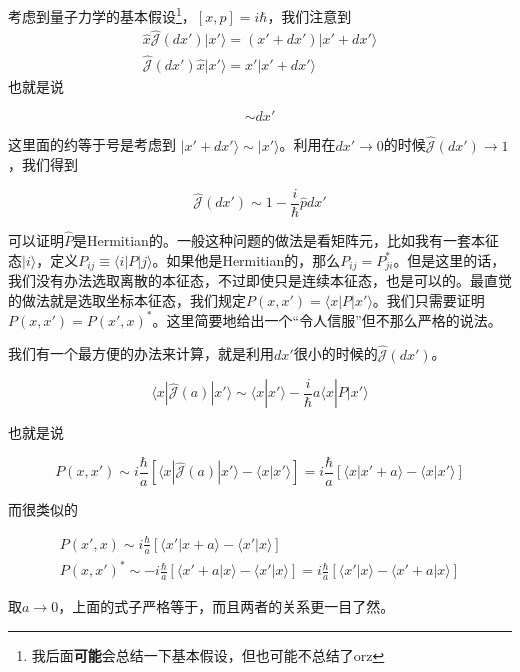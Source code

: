 考虑到量子力学的基本假设\footnote{我后面{\bf 可能}会总结一下基本假设，但也可能不总结了orz}，$[x,p] = i\hbar$，我们注意到
\begin{gather}
\hat{x}\hat{\mathcal{J}}(dx')|x'\rangle = (x'+dx')|x'+dx'\rangle\\
\hat{\mathcal{J}}(dx')\hat{x}|x'\rangle = x'|x'+dx'\rangle
\end{gather}
也就是说

\begin{equation}
[\hat{x},\hat{\mathcal{J}}(dx')] \sim dx'
\end{equation}

这里面的约等于号是考虑到 $|x'+dx'\rangle \sim |x'\rangle$。利用在$dx'\rightarrow0$的时候$\hat{\mathcal{J}}(dx')\rightarrow1$，我们得到

\begin{equation}
\hat{\mathcal{J}}(dx') \sim 1-\frac{i}{\hbar}\hat{p}dx'
\end{equation}

\begin{exam}{}
可以证明$\hat{P}$是Hermitian的。一般这种问题的做法是看矩阵元，比如我有一套本征态$|i\rangle$，定义$P_{ij} \equiv \langle i|P|j\rangle$。如果他是Hermitian的，那么$P_{ij} = P_{ji}^*$。但是这里的话，我们没有办法选取离散的本征态，不过即使只是连续本征态，也是可以的。最直觉的做法就是选取坐标本征态，我们规定$P(x,x') = \langle x|P|x'\rangle$。我们只需要证明$P(x,x') = P(x',x)^*$。这里简要地给出一个“令人信服”但不那么严格的说法。

我们有一个最方便的办法来计算，就是利用$dx'$很小的时候的$\hat{\mathcal{J}}(dx')$。

\begin{equation}
\langle x|\hat{\mathcal{J}}(a)|x'\rangle \sim \langle x|x'\rangle - \frac{i}{\hbar} a \langle x|P|x'\rangle
\end{equation}

也就是说

\begin{equation}
P(x,x') \sim i\frac{\hbar}{a}[\langle x|\hat{\mathcal{J}}(a)|x'\rangle - \langle x|x'\rangle] = i\frac{\hbar}{a}[\langle x|x'+a\rangle - \langle x|x'\rangle]
\end{equation}

而很类似的

\begin{gather}
P(x',x) \sim i\frac{\hbar}{a}[\langle x'|x+a\rangle - \langle x'|x\rangle]\\
P(x,x')^* \sim -i\frac{\hbar}{a} [\langle x'+a|x\rangle - \langle x'|x\rangle] = i\frac{\hbar}{a} [\langle x'|x\rangle - \langle x'+a|x\rangle]
\end{gather}

取$a\rightarrow0$，上面的式子严格等于，而且两者的关系更一目了然。
\end{exam}

